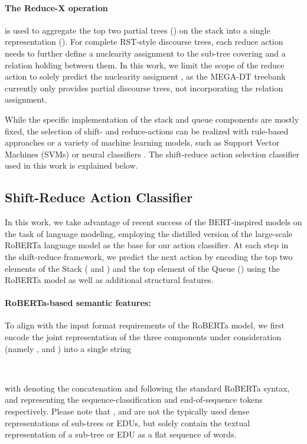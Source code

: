 \documentclass[11pt]{article}
\begin{document}
\paragraph{The Reduce-X operation}is used to aggregate the top two partial trees () on the stack into a single representation (). For complete RST-style discourse trees, each reduce action needs to further define a nuclearity assignment  to the sub-tree covering  and a relation  holding between them. In this work, we limit the scope of the reduce action to solely predict the nuclearity assigment , as the MEGA-DT treebank currently only provides partial discourse trees, not incorporating the relation assignment.

While the specific implementation of the stack and queue components are mostly fixed, the selection of shift- and reduce-actions can be realized with rule-based approaches \cite{marcu-discourse} or a variety of machine learning models, such as Support Vector Machines (SVMs) \cite{ji2014representation} or neural classifiers \cite{yu2018transition}.
The shift-reduce action selection classifier used in this work is explained below. 

\subsection{Shift-Reduce Action Classifier}
\label{operation_explanation}
In this work, we take advantage of recent success of the BERT-inspired models on the task of language modeling, employing the distilled version \cite{sanh2019distilbert} of the large-scale RoBERTa \cite{liu2019roberta} language model as the base for our action classifier. At each step in the shift-reduce framework, we predict the next action by encoding the top two elements of the Stack ( and ) and the top element of the Queue () \cite{wang-etal-2017-two} using the RoBERTa model as well as additional structural features. 

\paragraph{RoBERTa-based semantic features:} To align with the input format requirements of the RoBERTa model, we first encode the joint representation of the three components under consideration (namely ,  and ) into a single string
\begin{center}
    \\
\end{center}
with  denoting the concatenation and following the standard RoBERTa syntax,  and  representing the sequence-classification and end-of-sequence tokens respectively. Please note that ,  and  are not the typically used dense representations of sub-trees or EDUs, but solely contain the textual representation of a sub-tree or EDU as a flat sequence of words.
\end{document}
